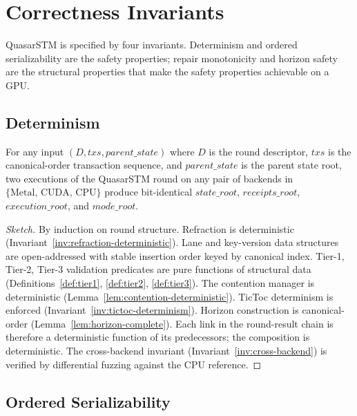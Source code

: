 \section{Correctness Invariants}

\label{sec:correctness}

QuasarSTM is specified by four invariants. Determinism and ordered
serializability are the safety properties; repair monotonicity and
horizon safety are the structural properties that make the safety
properties achievable on a GPU.

\subsection{Determinism}

\begin{theorem}[Determinism]
\label{thm:determinism}
For any input $(D, \mathit{txs}, \mathit{parent\_state})$ where $D$
is the round descriptor, $\mathit{txs}$ is the canonical-order
transaction sequence, and $\mathit{parent\_state}$ is the parent
state root, two executions of the QuasarSTM round on any pair of
backends in $\{\mathrm{Metal},\, \mathrm{CUDA},\, \mathrm{CPU}\}$
produce bit-identical $\mathit{state\_root}$,
$\mathit{receipts\_root}$, $\mathit{execution\_root}$, and
$\mathit{mode\_root}$.
\end{theorem}

\begin{proof}[Sketch]
By induction on round structure. Refraction is deterministic
(Invariant~\ref{inv:refraction-deterministic}). Lane and key-version
data structures are open-addressed with stable insertion order
keyed by canonical index. Tier-1, Tier-2, Tier-3 validation
predicates are pure functions of structural data
(Definitions~\ref{def:tier1}, \ref{def:tier2}, \ref{def:tier3}).
The contention manager is deterministic
(Lemma~\ref{lem:contention-deterministic}). TicToc determinism is
enforced (Invariant~\ref{inv:tictoc-determinism}). Horizon
construction is canonical-order (Lemma~\ref{lem:horizon-complete}).
Each link in the round-result chain is therefore a deterministic
function of its predecessors; the composition is deterministic.
The cross-backend invariant (Invariant~\ref{inv:cross-backend}) is
verified by differential fuzzing against the CPU reference.
\end{proof}

\subsection{Ordered Serializability}

